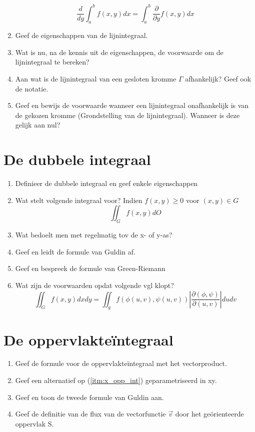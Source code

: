 \documentclass[12pt]{article}
\begin{document}
\begin{enumerate}
            $$ \frac{d}{dy}\int_a^b f(x,y)dx = \int_a^b \frac{\partial}{\partial y}f(x, y)dx $$
        \item Geef de eigenschappen van de lijnintegraal.
        \item Wat is nu, na de kennis uit de eigenschappen, de voorwaarde om de lijnintegraal te bereken?
        \item Aan wat is de lijnintegraal van een gesloten kromme $\Gamma$ afhankelijk? Geef ook de notatie.
        \item Geef en bewijs de voorwaarde wanneer een lijnintegraal onafhankelijk is van de gekozen kromme (Grondstelling van de lijnintegraal). Wanneer is deze gelijk aan nul?
    \end{enumerate}

    \section{De dubbele integraal}
    \begin{enumerate}
        \item Definieer de dubbele integraal en geef enkele eigenschappen
        \item Wat stelt volgende integraal voor? Indien $f(x,y) \geq 0$ voor $(x,y) \in G$
            $$ \iint_G f(x,y)dO $$
        \item Wat bedoelt men met regelmatig tov de x- of y-as?
        \item Geef en leidt de formule van Guldin af.
        \item Geef en bespreek de formule van Green-Riemann
        \item Wat zijn de voorwaarden opdat volgende vgl klopt?
            $$ \iint_G f(x,y)dxdy = \iint_g f(\phi(u,v), \psi(u,v)) \left|\frac{\partial(\phi, \psi)}{\partial(u,v)}\right| dudv $$
    \end{enumerate}

    \section{De oppervlakte\"integraal}
    \begin{enumerate}
        \item \label{itm:x_opp_int} Geef de formule voor de oppervlakte\"integraal met het vectorproduct.
        \item Geef een alternatief op (\ref{itm:x_opp_int}) geparametriseerd in xy.
        \item Geef en toon de tweede formule van Guldin aan.
        \item Geef de definitie van de flux van de vectorfunctie $\vec{v}$ door het ge\"orienteerde oppervlak S.
    \end{enumerate}
\end{document}
